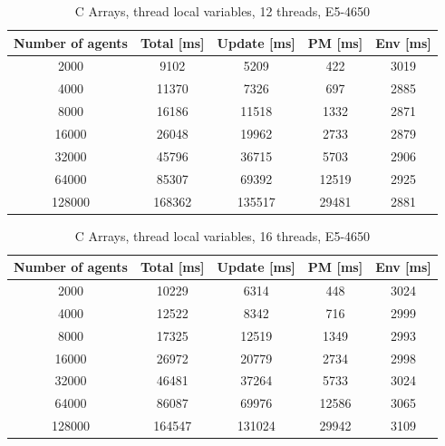 \documentclass[12pt, a4paper]{report}
\begin{document}
\begin{appendices}
\begin{table}[H]
  \begin{center}
    \begin{tabular}{|c||c||c|c|c|}
    \hline
    Number of agents & Total [ms] & Update [ms] & PM [ms] & Env [ms] \\ \hline
    2000             & 9102       & 5209        & 422     & 3019     \\
    4000             & 11370      & 7326        & 697     & 2885     \\
    8000             & 16186      & 11518       & 1332    & 2871     \\
    16000            & 26048      & 19962       & 2733    & 2879     \\
    32000            & 45796      & 36715       & 5703    & 2906     \\
    64000            & 85307      & 69392       & 12519   & 2925     \\
    128000           & 168362     & 135517      & 29481   & 2881     \\ \hline
    \end{tabular}
    \caption {C Arrays, thread local variables, 12 threads, E5-4650}
    \label{table:append-c-arrays-12-thread-potoo}
  \end{center}
\end{table}

\begin{table}[H]
  \begin{center}
    \begin{tabular}{|c||c||c|c|c|}
    \hline
    Number of agents & Total [ms] & Update [ms] & PM [ms] & Env [ms] \\ \hline
    2000             & 10229      & 6314        & 448     & 3024     \\
    4000             & 12522      & 8342        & 716     & 2999     \\
    8000             & 17325      & 12519       & 1349    & 2993     \\
    16000            & 26972      & 20779       & 2734    & 2998     \\
    32000            & 46481      & 37264       & 5733    & 3024     \\
    64000            & 86087      & 69976       & 12586   & 3065     \\
    128000           & 164547     & 131024      & 29942   & 3109     \\ \hline
    \end{tabular}
    \caption {C Arrays, thread local variables, 16 threads, E5-4650}
    \label{table:append-c-arrays-16-thread-potoo}
  \end{center}
\end{table}


\end{appendices}
\end{document}
